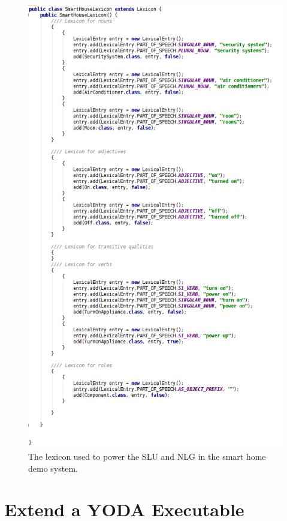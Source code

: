 \documentclass[titlepage]{article}
\begin{document}
\begin{figure}[h!]
\centering
\includegraphics[height=.95\textheight]{Lexicon}
\caption{The lexicon used to power the SLU and NLG in the smart home demo system.}
\label{fig:lexicon}
\end{figure}


\section{Extend a YODA Executable}
\end{document}
